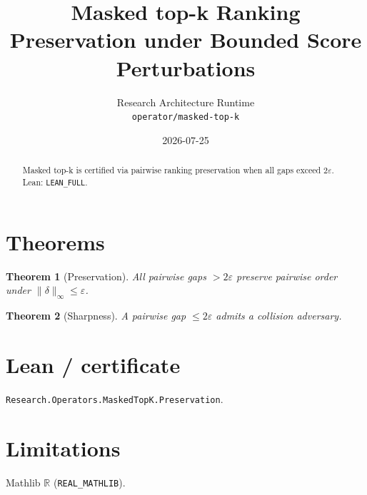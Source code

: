 \documentclass[11pt]{article}
\title{Masked top-k Ranking Preservation under Bounded Score Perturbations}
\author{Research Architecture Runtime \\ \texttt{operator/masked-top-k}}
\date{2026-07-25}
\newtheorem{theorem}{Theorem}
\begin{document}
\maketitle
\begin{abstract}
Masked top-k is certified via pairwise ranking preservation when all gaps exceed $2\varepsilon$. Lean: \texttt{LEAN\_FULL}.
\end{abstract}
\section{Theorems}
\begin{theorem}[Preservation]
All pairwise gaps $>2\varepsilon$ preserve pairwise order under $\|\delta\|_\infty\le\varepsilon$.
\end{theorem}
\begin{theorem}[Sharpness]
A pairwise gap $\le 2\varepsilon$ admits a collision adversary.
\end{theorem}
\section{Lean / certificate}
\texttt{Research.Operators.MaskedTopK.Preservation}.
\section{Limitations}
Mathlib $\mathbb{R}$ (\texttt{REAL\_MATHLIB}).
\end{document}
